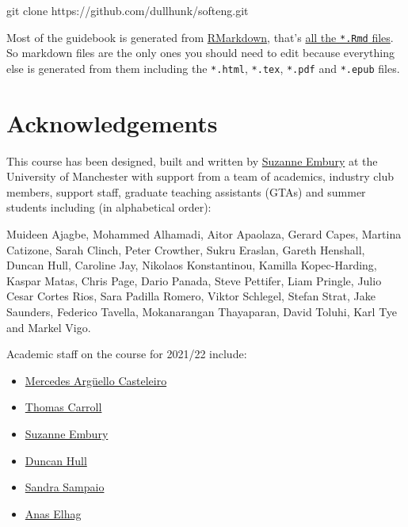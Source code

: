 \documentclass[
]{book}
\newenvironment{Shaded}{\begin{snugshade}}{\end{snugshade}}
\newcommand{\NormalTok}[1]{#1}
\providecommand{\tightlist}{%
  \setlength{\itemsep}{0pt}\setlength{\parskip}{0pt}}
\begin{document}
\begin{Shaded}
\begin{Highlighting}[]
\NormalTok{git clone https://github.com/dullhunk/softeng.git}
\end{Highlighting}
\end{Shaded}

Most of the guidebook is generated from \href{https://en.wikipedia.org/wiki/Markdown}{RMarkdown}, that's \href{https://github.com/dullhunk/softeng/search?l=RMarkdown}{all the \texttt{*.Rmd} files}. So markdown files are the only ones you should need to edit because everything else is generated from them including the \texttt{*.html}, \texttt{*.tex}, \texttt{*.pdf} and \texttt{*.epub} files.

\hypertarget{teambury}{%
\section{Acknowledgements}\label{teambury}}

This course has been designed, built and written by \href{http://www.cs.man.ac.uk/~embury/}{Suzanne Embury} at the University of Manchester with support from a team of academics, industry club members, support staff, graduate teaching assistants (GTAs) and summer students including (in alphabetical order):

Muideen Ajagbe, Mohammed Alhamadi, Aitor Apaolaza, Gerard Capes, Martina Catizone, Sarah Clinch, Peter Crowther, Sukru Eraslan, Gareth Henshall, Duncan Hull, Caroline Jay, Nikolaos Konstantinou, Kamilla Kopec-Harding, Kaspar Matas, Chris Page, Dario Panada, Steve Pettifer, Liam Pringle, Julio Cesar Cortes Rios, Sara Padilla Romero, Viktor Schlegel, Stefan Strat, Jake Saunders, Federico Tavella, Mokanarangan Thayaparan, David Toluhi, Karl Tye and Markel Vigo.

Academic staff on the course for 2021/22 include:

\begin{itemize}
\tightlist
\item
  \href{https://scholar.google.com/citations?user=ci1ifBoAAAAJ\&hl=en}{Mercedes Argüello Casteleiro}
\item
  \href{https://personalpages.manchester.ac.uk/staff/thomas.carroll/}{Thomas Carroll}
\item
  \href{http://www.cs.man.ac.uk/~embury/}{Suzanne Embury}
\item
  \href{http://www.cs.man.ac.uk/~hulld/}{Duncan Hull}
\item
  \href{https://www.research.manchester.ac.uk/portal/s.sampaio.html}{Sandra Sampaio}
\item
  \href{https://scholar.google.co.uk/citations?user=eY8KtX4AAAAJ\&hl=en}{Anas Elhag}
\end{itemize}
\end{document}
